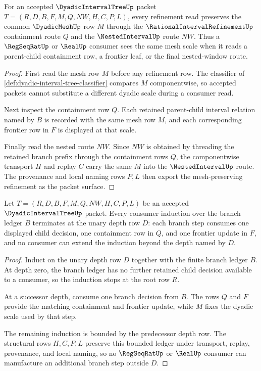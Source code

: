 \begin{theorem}
\label{thm:dyadic-interval-tree-mesh-refinement-functoriality}
For an accepted $\DyadicIntervalTreeUp$ packet $T=(R,D,B,F,M,Q,NW,H,C,P,L)$, every refinement read preserves the common $\DyadicMeshUp$ row $M$ through the $\RationalIntervalRefinementUp$ containment route $Q$ and the $\NestedIntervalUp$ route $NW$. Thus a $\RegSeqRatUp$ or $\RealUp$ consumer sees the same mesh scale when it reads a parent-child containment row, a frontier leaf, or the final nested-window route.
\end{theorem}
\begin{proof}
First read the mesh row $M$ before any refinement row. The classifier of \autoref{def:dyadic-interval-tree-classifier} compares $M$ componentwise, so accepted packets cannot substitute a different dyadic scale during a consumer read.

Next inspect the containment row $Q$. Each retained parent-child interval relation named by $B$ is recorded with the same mesh row $M$, and each corresponding frontier row in $F$ is displayed at that scale.

Finally read the nested route $NW$. Since $NW$ is obtained by threading the retained branch prefix through the containment rows $Q$, the componentwise transport $H$ and replay $C$ carry the same $M$ into the $\NestedIntervalUp$ route. The provenance and local naming rows $P,L$ then export the mesh-preserving refinement as the packet surface.
\end{proof}

\begin{theorem}
\label{thm:dyadic-interval-tree-branch-ledger-depth-bound}
Let $T=(R,D,B,F,M,Q,NW,H,C,P,L)$ be an accepted $\DyadicIntervalTreeUp$ packet. Every consumer induction over the branch ledger $B$ terminates at the unary depth row $D$: each branch step consumes one displayed child decision, one containment row in $Q$, and one frontier update in $F$, and no consumer can extend the induction beyond the depth named by $D$.
\end{theorem}
\begin{proof}
Induct on the unary depth row $D$ together with the finite branch ledger $B$. At depth zero, the branch ledger has no further retained child decision available to a consumer, so the induction stops at the root row $R$.

At a successor depth, consume one branch decision from $B$. The rows $Q$ and $F$ provide the matching containment and frontier update, while $M$ fixes the dyadic scale used by that step.

The remaining induction is bounded by the predecessor depth row. The structural rows $H,C,P,L$ preserve this bounded ledger under transport, replay, provenance, and local naming, so no $\RegSeqRatUp$ or $\RealUp$ consumer can manufacture an additional branch step outside $D$.
\end{proof}

